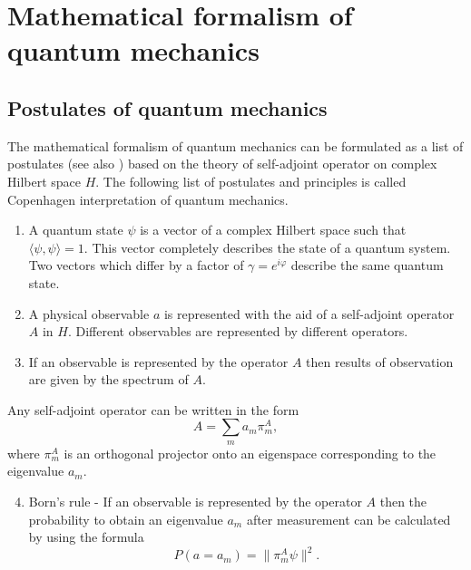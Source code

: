 \documentclass[%
master,         %
subf,           %
href,           %
colorlinks=true %
]{disser}
\numberwithin{equation}{section}
\numberwithin{figure}{section}
\begin{document}
\section{Mathematical formalism of quantum mechanics}
\subsection{Postulates of quantum mechanics }
The mathematical formalism of quantum mechanics can be formulated as a list of postulates \cite{Khrennikov_information} (see also \cite{khrennikov_contextual}) based on the theory of self-adjoint operator on complex Hilbert space $H$. The following list of postulates and principles is called Copenhagen interpretation of quantum mechanics.
\begin{enumerate}[label=\bfseries Postulate \arabic*:, align=left]
  \item A quantum state $\psi$ is a vector of a complex Hilbert space such that $\langle\psi, \psi\rangle = 1$. This vector completely describes the state of a quantum system. Two vectors which differ by a factor of $\gamma = e^{i\varphi}$ describe the same quantum state.
  \item A physical observable $a$ is represented with the aid of a self-adjoint operator $A$ in $H$. Different observables are represented by different operators.
  \item If an observable is represented by the operator $A$ then results of observation are given by the spectrum of $A$.
\end{enumerate}
Any self-adjoint operator can be written in the form 
  \[
  A = \sum_m a_m\pi_m^A,
  \]
    where $\pi_m^A$ is an orthogonal projector onto an eigenspace corresponding to the eigenvalue $a_m$.
\begin{enumerate}[label=\bfseries Postulate \arabic*:, align=left]
  \setcounter{enumi}{3}
  \item Born's rule - If an observable is represented by the operator $A$ then the probability to obtain an eigenvalue $a_m$ after measurement can be calculated by using the formula
  \[
  P(a = a_m) = \| \pi_m^A\psi\|^2.
  \]
\end{enumerate}
\end{document}
